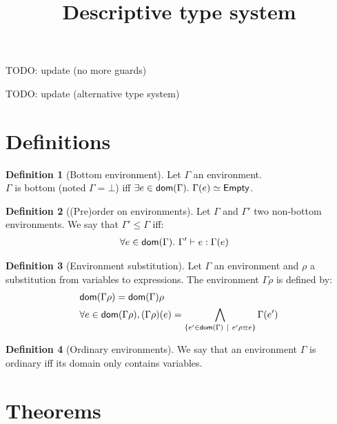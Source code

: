 \documentclass[a4paper]{article}
\title{\vspace{1.5cm}Descriptive type system}
\author{}
\date{\vspace{-5ex}}
\theoremstyle{definition}
\newtheorem{definition}{Definition}
\begin{document}
  \maketitle

  TODO: update (no more guards)

  TODO: update (alternative type system)
  
    \section{Definitions}

    \begin{definition}[Bottom environment]
      Let $\Gamma$ an environment.\\
      $\Gamma$ is bottom (noted $\Gamma = \bot$) iff $\exists e\in\dom\Gamma.\ \Gamma(e)\simeq\Empty$.
    \end{definition}

      \begin{definition}[(Pre)order on environments]
        Let $\Gamma$ and $\Gamma'$ two non-bottom environments. We say that $\Gamma' \leq \Gamma$ iff:
        \begin{align*}
          &\forall e \in \textsf{dom}(\Gamma).\ \Gamma' \vdash e : \Gamma(e)
        \end{align*}
      \end{definition}
    
      \begin{definition}[Environment substitution]
        Let $\Gamma$ an environment and $\rho$ a substitution from variables to expressions.
        The environment $\Gamma\rho$ is defined by:
        \begin{align*}
          &\textsf{dom}(\Gamma\rho) = \textsf{dom}(\Gamma) \rho\\
          &\forall e \in \textsf{dom}(\Gamma\rho), (\Gamma\rho)(e) = \bigwedge_{\{e' \in \textsf{dom}(\Gamma) ~|~ e'\rho\equiv e\}}\Gamma(e')
        \end{align*}
      \end{definition}
    
      \begin{definition}[Ordinary environments]
        We say that an environment $\Gamma$ is ordinary iff its domain only contains variables.
      \end{definition}

    \section{Theorems}
\end{document}
